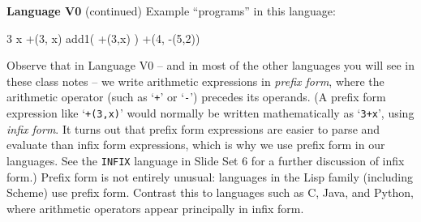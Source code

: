 \begin{minipage}[t]{\sw}
\slidenumber
\LARGE
{\bf Language V0} (continued)\exx
Example ``programs'' in this language:
\begin{qv}
3
x
+(3, x)
add1( +(3,x) )
+(4, -(5,2))
\end{qv}
Observe that in Language V0 --
and in most of the other languages
you will see in these class notes --
we write arithmetic expressions in {\em prefix form},
where the arithmetic operator (such as `\verb'+'' or `\verb'-'')
precedes its operands.
(A prefix form expression like `\verb'+(3,x)'' would normally be written
mathematically as `\verb'3+x'', using {\em infix form}.
It turns out that prefix form expressions are easier
to parse and evaluate
than infix form expressions,
which is why we use prefix form in our languages.
See the \verb'INFIX' language in Slide Set 6
for a further discussion of infix form.)\exx
Prefix form is not entirely unusual:
languages in the Lisp family (including Scheme) use prefix form.
Contrast this to languages such as C, Java, and Python,
where arithmetic operators appear principally in infix form.
\end{minipage}
\clearpage
